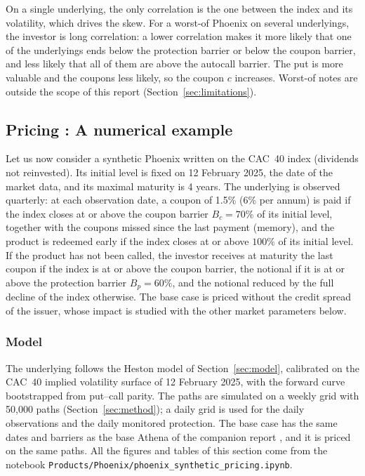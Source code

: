 \documentclass[11pt,a4paper]{article}
\newcommand{\code}[1]{\texttt{#1}}
\begin{document}
On a single underlying, the only correlation is the one between the index and its volatility, which drives the skew.
For a worst-of Phoenix on several underlyings, the investor is long correlation: a lower correlation makes it more
likely that one of the underlyings ends below the protection barrier or below the coupon barrier, and less likely
that all of them are above the autocall barrier. The put is more valuable and the coupons less likely, so the
coupon $c$ increases. Worst-of notes are outside the scope of this report (Section~\ref{sec:limitations}).


\subsection{Pricing : A numerical example}


Let us now consider a synthetic Phoenix written on the CAC~40 index (dividends not reinvested). Its initial
level is fixed on 12 February 2025, the date of the market data, and its maximal maturity is 4 years. The underlying
is observed quarterly: at each observation date, a coupon of 1.5\% (6\% per annum) is paid if the index closes at or
above the coupon barrier $B_c = 70\%$ of its initial level, together with the coupons missed since the last payment
(memory), and the product is redeemed early if the index closes at or above $100\%$ of its initial level. If the
product has not been called, the investor receives at maturity the last coupon if the index is at or above the coupon
barrier, the notional if it is at or above the protection barrier $B_p = 60\%$, and the notional reduced by the full
decline of the index otherwise. The base case is priced without the credit spread of the issuer, whose impact is
studied with the other market parameters below.

\subsubsection{Model}

The underlying follows the Heston model of Section~\ref{sec:model}, calibrated on the CAC~40 implied volatility
surface of 12 February 2025, with the forward curve bootstrapped from put--call parity. The paths are simulated on a
weekly grid with 50{,}000 paths (Section~\ref{sec:method}); a daily grid is used for the daily observations and the
daily monitored protection. The base case has the same dates and barriers as the base Athena of the companion report
\cite{benguedda2026athena}, and it is priced on the same paths. All the figures and tables of this section come from
the notebook \code{Products/Phoenix/phoenix\_synthetic\_pricing.ipynb}.
\end{document}
